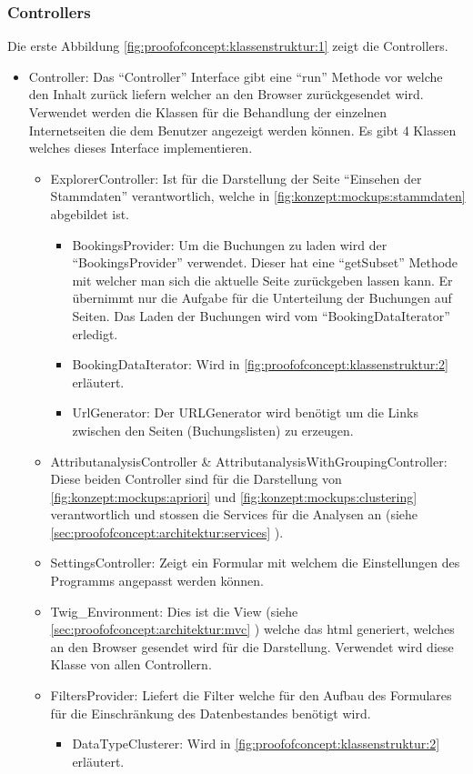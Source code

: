 \subsubsection{Controllers}
\label{sec:proofofconcept:klassenstruktur:controllers}
Die erste Abbildung \cref{fig:proofofconcept:klassenstruktur:1} zeigt die Controllers. 
\begin{itemize}
	 \item Controller: Das "`Controller"' Interface gibt eine "`run"' Methode vor welche den Inhalt zurück liefern welcher an den Browser zurückgesendet wird. Verwendet werden die Klassen für die Behandlung der einzelnen Internetseiten die dem Benutzer angezeigt werden können. Es gibt 4 Klassen welches dieses Interface implementieren.
	 \begin{itemize}
		\item ExplorerController: Ist für die Darstellung der Seite "`Einsehen der Stammdaten"' verantwortlich, welche in \cref{fig:konzept:mockups:stammdaten} abgebildet ist.
			\begin{itemize}
				\item BookingsProvider: Um die Buchungen zu laden wird der "`BookingsProvider"' verwendet. Dieser hat eine "`getSubset"' Methode mit welcher man sich die aktuelle Seite zurückgeben lassen kann. Er übernimmt nur die Aufgabe für die Unterteilung der Buchungen auf Seiten. Das Laden der Buchungen wird vom "`BookingDataIterator"' erledigt.
				\item BookingDataIterator: Wird in \cref{fig:proofofconcept:klassenstruktur:2} erläutert.
				\item UrlGenerator: Der URLGenerator wird benötigt um die Links zwischen den Seiten (Buchungslisten) zu erzeugen.
			\end{itemize}
		\item AttributanalysisController \& AttributanalysisWithGroupingController: Diese beiden Controller sind für die Darstellung von \cref{fig:konzept:mockups:apriori} und \cref{fig:konzept:mockups:clustering} verantwortlich und stossen die Services für die Analysen an (siehe \cref{sec:proofofconcept:architektur:services} ). 
		\item SettingsController: Zeigt ein Formular mit welchem die Einstellungen des Programms angepasst werden können.
		\item Twig\_Environment: Dies ist die View (siehe \cref{sec:proofofconcept:architektur:mvc} ) welche das \gls{html} generiert, welches an den Browser gesendet wird für die Darstellung. Verwendet wird diese Klasse von allen Controllern.
		\item FiltersProvider: Liefert die Filter welche für den Aufbau des Formulares für die Einschränkung des Datenbestandes benötigt wird.
			\begin{itemize}
				\item DataTypeClusterer: Wird in \cref{fig:proofofconcept:klassenstruktur:2} erläutert.
			\end{itemize}
	 \end{itemize}
\end{itemize}

